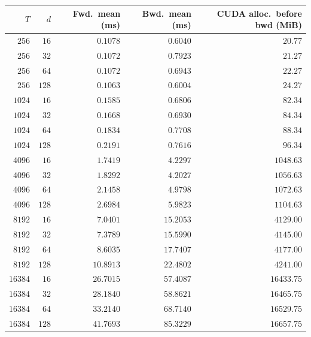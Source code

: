 \begin{tabular}{rrrrr}
  \toprule
  $T$ & $d$ & Fwd.\ mean (ms) & Bwd.\ mean (ms) & CUDA alloc.\ before bwd (MiB) \\
  \midrule
  $256$ & $16$ & $0.1078$ & $0.6040$ & $20.77$ \\
  $256$ & $32$ & $0.1072$ & $0.7923$ & $21.27$ \\
  $256$ & $64$ & $0.1072$ & $0.6943$ & $22.27$ \\
  $256$ & $128$ & $0.1063$ & $0.6004$ & $24.27$ \\
  $1024$ & $16$ & $0.1585$ & $0.6806$ & $82.34$ \\
  $1024$ & $32$ & $0.1668$ & $0.6930$ & $84.34$ \\
  $1024$ & $64$ & $0.1834$ & $0.7708$ & $88.34$ \\
  $1024$ & $128$ & $0.2191$ & $0.7616$ & $96.34$ \\
  $4096$ & $16$ & $1.7419$ & $4.2297$ & $1048.63$ \\
  $4096$ & $32$ & $1.8292$ & $4.2027$ & $1056.63$ \\
  $4096$ & $64$ & $2.1458$ & $4.9798$ & $1072.63$ \\
  $4096$ & $128$ & $2.6984$ & $5.9823$ & $1104.63$ \\
  $8192$ & $16$ & $7.0401$ & $15.2053$ & $4129.00$ \\
  $8192$ & $32$ & $7.3789$ & $15.5990$ & $4145.00$ \\
  $8192$ & $64$ & $8.6035$ & $17.7407$ & $4177.00$ \\
  $8192$ & $128$ & $10.8913$ & $22.4802$ & $4241.00$ \\
  $16384$ & $16$ & $26.7015$ & $57.4087$ & $16433.75$ \\
  $16384$ & $32$ & $28.1840$ & $58.8621$ & $16465.75$ \\
  $16384$ & $64$ & $33.2140$ & $68.7140$ & $16529.75$ \\
  $16384$ & $128$ & $41.7693$ & $85.3229$ & $16657.75$ \\
  \bottomrule
\end{tabular}

